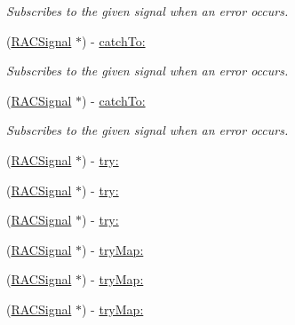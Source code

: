 \begin{DoxyCompactItemize}
\begin{DoxyCompactList}\small\item\em Subscribes to the given signal when an error occurs. \end{DoxyCompactList}\item 
\mbox{\label{interface_r_a_c_signal_a0b1efe6d0548703cb25b8e436532e574}} 
(\mbox{\hyperlink{interface_r_a_c_signal}{R\+A\+C\+Signal}} $\ast$) -\/ \mbox{\hyperlink{interface_r_a_c_signal_a0b1efe6d0548703cb25b8e436532e574}{catch\+To\+:}}
\begin{DoxyCompactList}\small\item\em Subscribes to the given signal when an error occurs. \end{DoxyCompactList}\item 
\mbox{\label{interface_r_a_c_signal_a0b1efe6d0548703cb25b8e436532e574}} 
(\mbox{\hyperlink{interface_r_a_c_signal}{R\+A\+C\+Signal}} $\ast$) -\/ \mbox{\hyperlink{interface_r_a_c_signal_a0b1efe6d0548703cb25b8e436532e574}{catch\+To\+:}}
\begin{DoxyCompactList}\small\item\em Subscribes to the given signal when an error occurs. \end{DoxyCompactList}\item 
(\mbox{\hyperlink{interface_r_a_c_signal}{R\+A\+C\+Signal}} $\ast$) -\/ \mbox{\hyperlink{interface_r_a_c_signal_ac65d7a1a19db9cb2f78c03781995bbe9}{try\+:}}
\item 
(\mbox{\hyperlink{interface_r_a_c_signal}{R\+A\+C\+Signal}} $\ast$) -\/ \mbox{\hyperlink{interface_r_a_c_signal_ac65d7a1a19db9cb2f78c03781995bbe9}{try\+:}}
\item 
(\mbox{\hyperlink{interface_r_a_c_signal}{R\+A\+C\+Signal}} $\ast$) -\/ \mbox{\hyperlink{interface_r_a_c_signal_ac65d7a1a19db9cb2f78c03781995bbe9}{try\+:}}
\item 
(\mbox{\hyperlink{interface_r_a_c_signal}{R\+A\+C\+Signal}} $\ast$) -\/ \mbox{\hyperlink{interface_r_a_c_signal_a282c8989886b5b9a75e4ecb298221b58}{try\+Map\+:}}
\item 
(\mbox{\hyperlink{interface_r_a_c_signal}{R\+A\+C\+Signal}} $\ast$) -\/ \mbox{\hyperlink{interface_r_a_c_signal_a282c8989886b5b9a75e4ecb298221b58}{try\+Map\+:}}
\item 
(\mbox{\hyperlink{interface_r_a_c_signal}{R\+A\+C\+Signal}} $\ast$) -\/ \mbox{\hyperlink{interface_r_a_c_signal_a282c8989886b5b9a75e4ecb298221b58}{try\+Map\+:}}

\end{DoxyCompactItemize}

